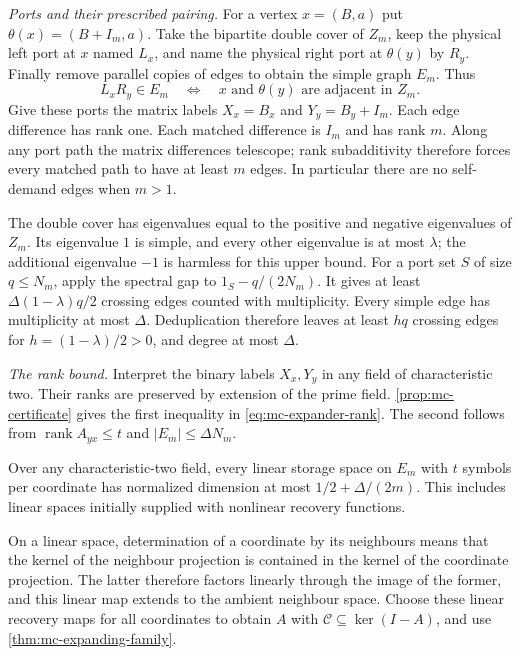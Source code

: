 \begin{informalproof}
\emph{Ports and their prescribed pairing.}
For a vertex $x=(B,a)$ put $\theta(x)=(B+I_m,a)$.
Take the bipartite double cover of $Z_m$, keep the physical left port
at $x$ named $L_x$, and name the physical right port at $\theta(y)$ by
$R_y$.  Finally remove parallel copies of edges to obtain the simple
graph $E_m$.  Thus
\begin{equation}
 L_xR_y\in E_m\quad\Longleftrightarrow\quad
 x\text{ and }\theta(y)\text{ are adjacent in }Z_m.
 \label{eq:mc-shifted-pairing}
\end{equation}
Give these ports the matrix labels $X_x=B_x$ and $Y_y=B_y+I_m$.
Each edge difference has rank one.  Each matched difference is $I_m$
and has rank $m$.  Along any port path the matrix differences telescope;
rank subadditivity therefore forces every matched path to have at least
$m$ edges.  In particular there are no self-demand edges when $m>1$.

The double cover has eigenvalues equal to the positive and negative
eigenvalues of $Z_m$.  Its eigenvalue $1$ is simple, and every other
eigenvalue is at most $\lambda$; the additional eigenvalue $-1$ is harmless
for this upper bound.  For a port set $S$ of size $q\le N_m$, apply
the spectral gap to $1_S-q/(2N_m)$.  It gives at least
$\Delta(1-\lambda)q/2$ crossing edges counted with multiplicity.
Every simple edge has multiplicity at most $\Delta$.  Deduplication
therefore leaves at least $hq$ crossing edges for
$h=(1-\lambda)/2>0$, and degree at most $\Delta$.

\emph{The rank bound.}
Interpret the binary labels $X_x,Y_y$ in any field of characteristic two.
Their ranks are preserved by extension of the prime field.
\cref{prop:mc-certificate} gives the first inequality in
\eqref{eq:mc-expander-rank}.  The second follows from
$\operatorname{rank}A_{yx}\le t$ and $|E_m|\le\Delta N_m$.
\end{informalproof}

\begin{corollary}
\label{cor:mc-linear-codes}
Over any characteristic-two field, every linear storage space on $E_m$
with $t$ symbols per coordinate has normalized dimension at most
$1/2+\Delta/(2m)$.  This includes linear spaces initially supplied with
nonlinear recovery functions.
\end{corollary}
\begin{informalproof}
On a linear space, determination of a coordinate by its neighbours means
that the kernel of the neighbour projection is contained in the kernel
of the coordinate projection.  The latter therefore factors linearly
through the image of the former, and this linear map extends to the
ambient neighbour space.  Choose these linear recovery maps for all
coordinates to obtain $A$ with $\mathcal C\subseteq\ker(I-A)$, and use
\cref{thm:mc-expanding-family}.
\end{informalproof}

